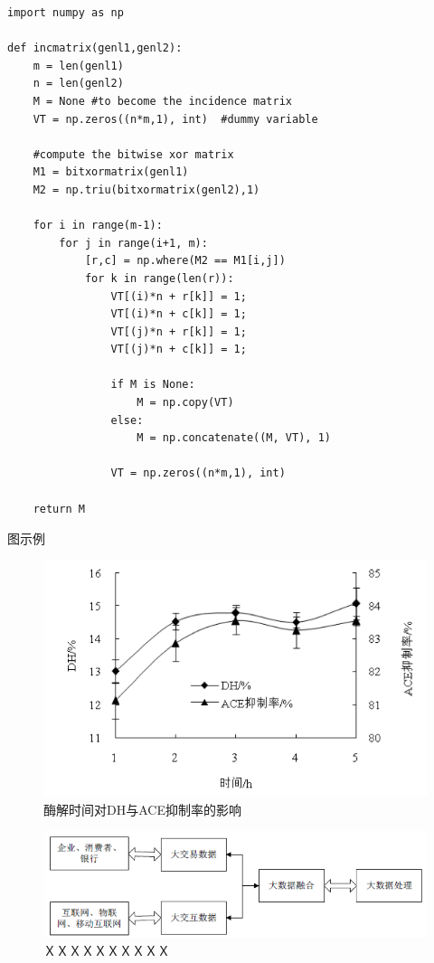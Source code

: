 \documentclass[a4paper]{ltxdoc}
\begin{document}
{\begin{verbatim}
import numpy as np

def incmatrix(genl1,genl2):
    m = len(genl1)
    n = len(genl2)
    M = None #to become the incidence matrix
    VT = np.zeros((n*m,1), int)  #dummy variable

    #compute the bitwise xor matrix
    M1 = bitxormatrix(genl1)
    M2 = np.triu(bitxormatrix(genl2),1)

    for i in range(m-1):
        for j in range(i+1, m):
            [r,c] = np.where(M2 == M1[i,j])
            for k in range(len(r)):
                VT[(i)*n + r[k]] = 1;
                VT[(i)*n + c[k]] = 1;
                VT[(j)*n + r[k]] = 1;
                VT[(j)*n + c[k]] = 1;

                if M is None:
                    M = np.copy(VT)
                else:
                    M = np.concatenate((M, VT), 1)

                VT = np.zeros((n*m,1), int)

    return M
\end{verbatim}


图示例
\begin{figure}[!htb]
	\centering
	\includegraphics{images/example_figure1.png}
	\caption{酶解时间对DH与ACE抑制率的影响}
\end{figure}

\begin{figure}[!htb]
	\centering
	\includegraphics{images/example_figure2.png}
	\caption{ＸＸＸＸＸＸＸＸＸＸ}
\end{figure}

}
\end{document}

